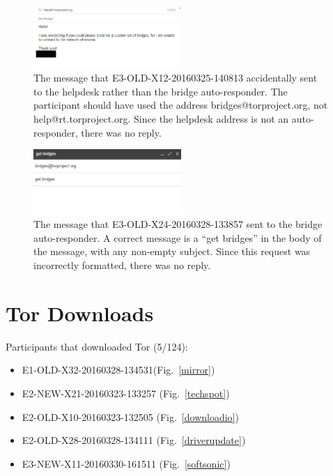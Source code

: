 \documentclass[USenglish,oneside,twocolumn]{article}
\begin{document}
\begin{figure}[h]
\includegraphics[width=0.5\textwidth]{../experiment/processing/failed-participants/20160328-133857-bridgeresponder-redacted.png}
\caption{The message that E3-OLD-X12-20160325-140813 accidentally sent to the helpdesk rather than the bridge auto-responder. The participant should have used the address bridges@torproject.org, not help@rt.torproject.org. Since the helpdesk address is not an auto-responder, there was no reply.}
\label{autoresponder2}
\end{figure} 

\begin{figure}[h]
\includegraphics[width=0.5\textwidth]{../experiment/processing/failed-participants/20160328-155924-bridgeresponder.png}
\caption{The message that E3-OLD-X24-20160328-133857 sent to the bridge auto-responder. A correct message is a ``get bridges'' in the body of the message, with any non-empty subject. Since this request was incorrectly formatted, there was no reply.}
\label{autoresponder3}
\end{figure} 

\section{Tor Downloads}
\label{tor-downloads}

Participants that downloaded Tor (5/124): 
\begin{itemize}
\item E1-OLD-X32-20160328-134531(Fig.~\ref{mirror})
\item E2-NEW-X21-20160323-133257 (Fig.~\ref{techspot})
\item E2-OLD-X10-20160323-132505 (Fig.~\ref{downloadio})
\item E2-OLD-X28-20160328-134111 (Fig.~\ref{driverupdate})
\item E3-NEW-X11-20160330-161511 (Fig.~\ref{softsonic})
\end{itemize} 
\end{document}
